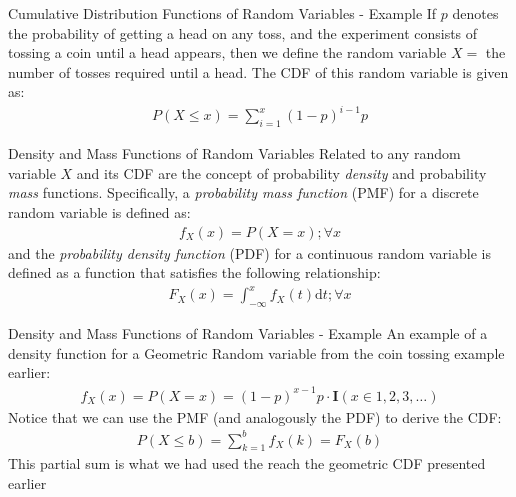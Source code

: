 \documentclass{beamer}
\begin{document}
\begin{frame}{Cumulative Distribution Functions of Random Variables - Example}
If $p$ denotes the probability of getting a head on any toss, and the experiment consists of tossing a coin until a head appears, then we define the random variable $X = $ the number of tosses required until a head. The CDF of this random variable is given as:
\begin{align*}
P(X \leq x) = \sum_{i = 1}^{x} (1-p)^{i-1}p
\end{align*}
\end{frame}
 
\begin{frame}{Density and Mass Functions of Random Variables}
Related to any random variable $X$ and its CDF are the concept of probability \emph{density} and probability \emph{mass} functions. Specifically, a \emph{probability mass function} (PMF) for a discrete random variable is defined as:
\begin{align*}
f_{X}(x) = P(X = x); \forall x
\end{align*}
and the \emph{probability density function} (PDF) for a continuous random variable is defined as a function that satisfies the following relationship:
\begin{align*}
F_{X}(x) = \int_{-\infty}^{x}f_{X}(t) \mathrm{d}t; \forall x
\end{align*}
\end{frame}

\begin{frame}{Density and Mass Functions of Random Variables - Example}
An example of a density function for a Geometric Random variable from the coin tossing example earlier:
\begin{align*}
f_{X}(x) = P(X = x) = (1-p)^{x-1}p \cdot \textbf{I}(x\in{1,2,3,\ldots})
\end{align*}
Notice that we can use the PMF (and analogously the PDF) to derive the CDF:
\begin{align*}
P(X\leq b) = \sum_{k = 1}^{b}f_{X}(k) = F_{X}(b)
\end{align*}
This partial sum is what we had used the reach the geometric CDF presented earlier
\end{frame}
\end{document}
